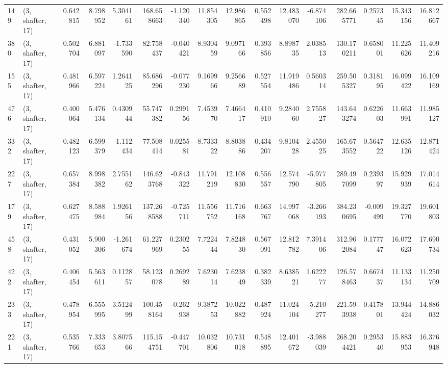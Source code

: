 \begin{tabular}{llrrrrrrrrrrrrrr}
149 &  (3, shafter, 17) &   0.642815 &   8.798952 &   5.304161 &   168.658663 &  -1.120340 &  11.854305 &  12.986865 &  0.552498 &  12.483070 &  -6.874106 &    282.665771 &    0.257345 &   15.343156 &   16.812667 \\
380 &  (3, shafter, 17) &   0.502704 &   6.881097 &  -1.733590 &    82.758437 &  -0.040421 &   8.930459 &   9.097166 &  0.393856 &   8.898735 &   2.038513 &    130.170211 &    0.658001 &   11.225626 &   11.409216 \\
155 &  (3, shafter, 17) &   0.481966 &   6.597224 &   1.264125 &    85.686296 &  -0.077230 &   9.169966 &   9.256689 &  0.527554 &  11.919486 &   0.560314 &    259.505327 &    0.318195 &   16.099422 &   16.109169 \\
476 &  (3, shafter, 17) &   0.400064 &   5.476134 &   0.430944 &    55.747382 &   0.299156 &   7.453970 &   7.466417 &  0.410910 &   9.284060 &   2.755827 &    143.643274 &    0.622603 &   11.663991 &   11.985127 \\
332 &  (3, shafter, 17) &   0.482123 &   6.599379 &  -1.112434 &    77.508414 &   0.025581 &   8.733322 &   8.803886 &  0.434207 &   9.810428 &   2.455025 &    165.673552 &    0.564722 &   12.635126 &   12.871424 \\
227 &  (3, shafter, 17) &   0.657384 &   8.998382 &   2.755162 &   146.623768 &  -0.843322 &  11.791219 &  12.108830 &  0.556557 &  12.574790 &  -5.977805 &    289.497099 &    0.239397 &   15.929939 &   17.014614 \\
179 &  (3, shafter, 17) &   0.627475 &   8.588984 &   1.926156 &   137.268588 &  -0.725711 &  11.556752 &  11.716168 &  0.663767 &  14.997068 &  -3.266193 &    384.230695 &   -0.009499 &   19.327770 &   19.601803 \\
458 &  (3, shafter, 17) &   0.431052 &   5.900306 &  -1.261674 &    61.227969 &   0.230255 &   7.722444 &   7.824830 &  0.567091 &  12.812782 &   7.391406 &    312.962084 &    0.177747 &   16.072623 &   17.690734 \\
422 &  (3, shafter, 17) &   0.406454 &   5.563611 &   0.112857 &    58.123078 &   0.269289 &   7.623014 &   7.623849 &  0.382339 &   8.638521 &   1.622277 &    126.578463 &    0.667437 &   11.133134 &   11.250709 \\
233 &  (3, shafter, 17) &   0.478954 &   6.555995 &   3.512499 &   100.458164 &  -0.262938 &   9.387253 &  10.022882 &  0.487924 &  11.024104 &  -5.210277 &    221.593938 &    0.417801 &   13.944424 &   14.886032 \\
221 &  (3, shafter, 17) &   0.535766 &   7.333653 &   3.807566 &   115.154751 &  -0.447701 &  10.032806 &  10.731018 &  0.548895 &  12.401672 &  -3.988039 &    268.204421 &    0.295340 &   15.883953 &   16.376948 \\

\end{tabular}
